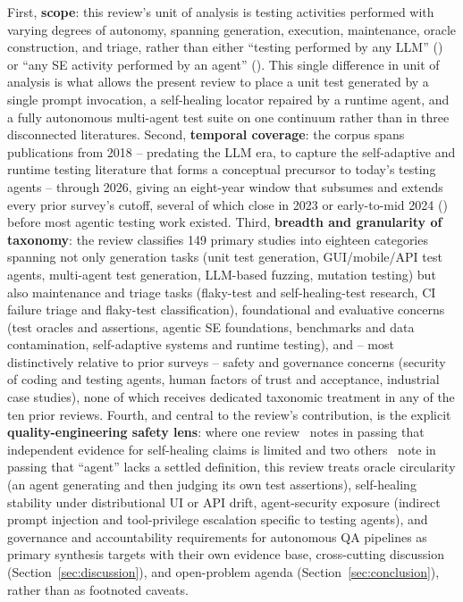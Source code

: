 First, \textbf{scope}: this review's unit of analysis is testing
activities performed with varying degrees of autonomy, spanning
generation, execution, maintenance, oracle construction, and triage,
rather than either ``testing performed by any LLM''
(\cite{slr0012024}) or ``any SE activity performed by an agent''
(\cite{slr0042024,slr0052024,slr0062024}). This single difference in
unit of analysis is what allows the present review to place a unit
test generated by a single prompt invocation, a self-healing locator
repaired by a runtime agent, and a fully autonomous multi-agent test
suite on one continuum rather than in three disconnected literatures.
Second,
\textbf{temporal coverage}: the corpus spans publications from 2018 --
predating the LLM era, to capture the self-adaptive and runtime
testing literature that forms a conceptual precursor to today's
testing agents -- through 2026, giving an eight-year window that
subsumes and extends every prior survey's cutoff, several of which
close in 2023 or early-to-mid 2024 (\cite{slr0022024,slr0032023})
before most agentic testing work existed. Third,
\textbf{breadth and granularity of taxonomy}: the review classifies
149 primary studies into eighteen categories spanning not only
generation tasks (unit test generation, GUI/mobile/API test agents,
multi-agent test generation, LLM-based fuzzing, mutation testing) but
also maintenance and triage tasks (flaky-test and self-healing-test
research, CI failure triage and flaky-test classification),
foundational and evaluative concerns (test oracles and assertions,
agentic SE foundations, benchmarks and data contamination,
self-adaptive systems and runtime testing), and -- most distinctively
relative to prior surveys -- safety and governance concerns
(security of coding and testing agents, human factors of trust and
acceptance, industrial case studies), none of which receives dedicated
taxonomic treatment in any of the ten prior reviews. Fourth, and
central to the review's contribution, is the explicit
\textbf{quality-engineering safety lens}: where one review~\cite{slr0092024}
notes in passing that independent evidence for self-healing claims is
limited and two others~\cite{slr0052024,slr0062024} note in passing that
``agent'' lacks a settled definition, this review treats oracle
circularity (an agent generating and then judging its own test
assertions), self-healing stability under distributional UI or API
drift, agent-security exposure (indirect prompt injection and
tool-privilege escalation specific to testing agents), and governance
and accountability requirements for autonomous QA pipelines as
primary synthesis targets with their own evidence base, cross-cutting
discussion (Section~\ref{sec:discussion}), and open-problem agenda
(Section~\ref{sec:conclusion}), rather than as footnoted caveats.

